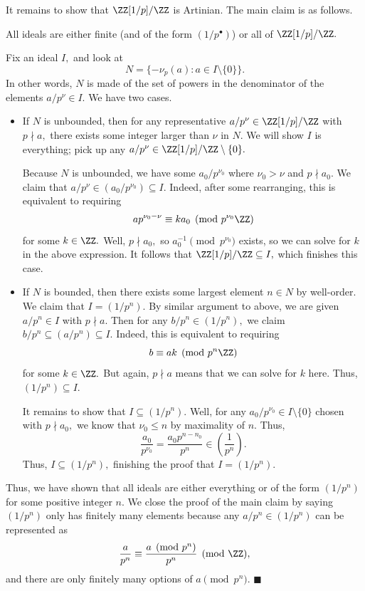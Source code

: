 It remains to show that $\ZZ[1/p]/\ZZ$ is Artinian. The main claim is as follows.
\begin{lemma}
    All ideals are either finite (and of the form $\left(1/p^\bullet\right)$) or all of $\ZZ[1/p]/\ZZ.$
\end{lemma}
Fix an ideal $I,$ and look at
\[N=\{-\nu_p(a):a\in I\setminus\{0\}\}.\]
In other words, $N$ is made of the set of powers in the denominator of the elements $a/p^\nu\in I.$ We have two cases.
\begin{itemize}
    \item If $N$ is unbounded, then for any representative $a/p^\nu\in\ZZ[1/p]/\ZZ$ with $p\nmid a,$ there exists some integer larger than $\nu$ in $N.$ We will show $I$ is everything; pick up any $a/p^\nu\in\ZZ[1/p]/\ZZ\setminus\{0\}.$
    
    Because $N$ is unbounded, we have some $a_0/p^{\nu_0}$ where $\nu_0>\nu$ and $p\nmid a_0.$ We claim that $a/p^\nu\in\left(a_0/p^{\nu_0}\right)\subseteq I.$ Indeed, after some rearranging, this is equivalent to requiring
    \[ap^{\nu_0-\nu}\equiv ka_0\pmod{p^{\nu_0}\ZZ}\]
    for some $k\in\ZZ.$ Well, $p\nmid a_0,$ so $a_0^{-1}\pmod{p^{\nu_0}}$ exists, so we can solve for $k$ in the above expression. It follows that $\ZZ[1/p]/\ZZ\subseteq I,$ which finishes this case.
    \item If $N$ is bounded, then there exists some largest element $n\in N$ by well-order. We claim that $I=\left(1/p^n\right).$ By similar argument to above, we are given $a/p^n\in I$ with $p\nmid a.$ Then for any $b/p^n\in\left(1/p^n\right),$ we claim $b/p^n\subseteq\left(a/p^n\right)\subseteq I.$ Indeed, this is equivalent to requiring
    \[b\equiv ak\pmod{p^n\ZZ}\]
    for some $k\in\ZZ.$ But again, $p\nmid a$ means that we can solve for $k$ here. Thus, $\left(1/p^n\right)\subseteq I.$
    
    It remains to show that $I\subseteq\left(1/p^n\right).$ Well, for any $a_0/p^{\nu_0}\in I\setminus\{0\}$ chosen with $p\nmid a_0,$ we know that $\nu_0\le n$ by maximality of $n.$ Thus,
    \[\frac{a_0}{p^{\nu_0}}=\frac{a_0p^{n-n_0}}{p^n}\in\left(\frac1{p^n}\right).\]
    Thus, $I\subseteq\left(1/p^n\right),$ finishing the proof that $I=\left(1/p^n\right).$
\end{itemize}
Thus, we have shown that all ideals are either everything or of the form $\left(1/p^n\right)$ for some positive integer $n.$ We close the proof of the main claim by saying $\left(1/p^n\right)$ only has finitely many elements because any $a/p^n\in\left(1/p^n\right)$ can be represented as
\[\frac a{p^n}\equiv\frac{a\pmod{p^n}}{p^n}\pmod\ZZ,\]
and there are only finitely many options of $a\pmod{p^n}.$ $\blacksquare$

